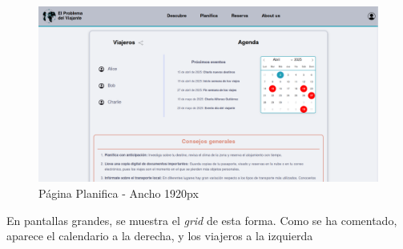 \documentclass[11pt, a4paper]{book}
\begin{document}
	\begin{figure} [H]
		\centering
		\includegraphics[width=\textwidth]{CSS/2-1 1920.png}
		\caption{Página Planifica - Ancho 1920px}
	\end{figure}

	En pantallas grandes, se muestra el \textit{grid} de esta forma. Como se ha comentado, aparece el calendario a la derecha, y los viajeros a la izquierda
\end{document}
